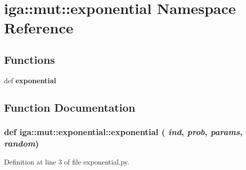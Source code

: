 \section{iga::mut::exponential Namespace Reference}
\label{namespaceiga_1_1mut_1_1exponential}


\subsection*{Functions}
\begin{CompactItemize}
\item 
def {\bf exponential}
\end{CompactItemize}


\subsection{Function Documentation}
\subsubsection{\setlength{\rightskip}{0pt plus 5cm}def iga::mut::exponential::exponential ( {\em ind},  {\em prob},  {\em params},  {\em random})}\label{namespaceiga_1_1mut_1_1exponential_055caeb5da349b926d31d437a7c55fae}




Definition at line 3 of file exponential.py.